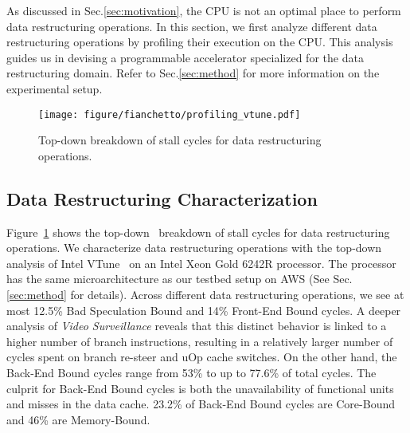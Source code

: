 As discussed in Sec.\ref{sec:motivation}, the CPU is not an optimal place to perform data restructuring operations. 
In this section, we first analyze different data restructuring operations by profiling their execution on the CPU. This analysis guides us in devising a programmable accelerator specialized for the data restructuring domain. Refer to Sec.\ref{sec:method} for more information on the experimental setup. %

\begin{figure}[ht!]
    \centering    
    \texttt{[image: figure/fianchetto/profiling\_vtune.pdf]}
    \caption{Top-down breakdown of stall cycles for data restructuring operations.}
    \label{fig:topdown}
\end{figure}

\subsection{Data Restructuring Characterization}
%
%
Figure~\ref{fig:topdown} shows the top-down~\cite{top-down:ispass:2014} breakdown of stall cycles for data restructuring operations. 
%
We characterize data restructuring operations with the top-down analysis of Intel VTune~\cite{intel-vtune} on an Intel Xeon Gold 6242R processor. 
%
The processor has the same microarchitecture as our testbed setup on AWS (See Sec.\ref{sec:method} for details).
%
Across different data restructuring operations, we see at most 12.5\% Bad Speculation Bound and 14\% Front-End Bound cycles. A deeper analysis of \textit{Video Surveillance} reveals that this distinct behavior is linked to a higher number of branch instructions, resulting in a relatively larger number of cycles spent on branch re-steer and uOp cache switches. On the other hand, the Back-End Bound cycles range from 53\% to up to 77.6\% of total cycles. The culprit for Back-End Bound cycles is both the unavailability of functional units and misses in the data cache. 23.2\% of Back-End Bound cycles are Core-Bound and 46\% are Memory-Bound. %

